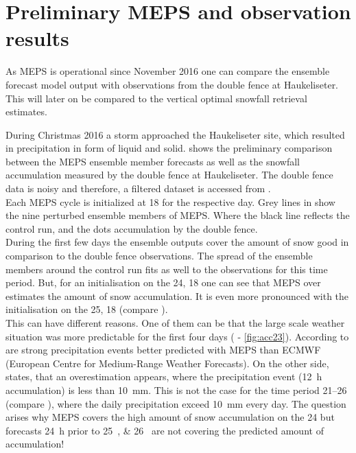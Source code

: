 \section{Preliminary MEPS and observation results}
\label{sec:PrelimMEPS}
As MEPS is operational since November 2016 one can compare the ensemble forecast model output with observations from the double fence at Haukeliseter. This will later on be compared to the vertical optimal snowfall retrieval estimates. 


\noindent
During Christmas 2016 a storm approached the Haukeliseter site, which resulted in precipitation in form of liquid and solid.
 shows the preliminary comparison between the MEPS ensemble member forecasts as well as the snowfall accumulation measured by the double fence at Haukeliseter. The double fence data is noisy and therefore, a filtered dataset is accessed from \cite{eklima_norwegian_2016}.   
\\
Each MEPS cycle is initialized at \SI{18}{\UTC} for the respective day.
Grey lines in  show the nine perturbed ensemble members of MEPS. Where the black line reflects the control run, and the dots accumulation by the double fence.
\\
During the first few days the ensemble outputs cover the amount of snow good in comparison to the double fence observations.
The spread of the ensemble members around the control run fits as well to the observations for this time period. But, for an initialisation on the \SI{24}{\dec}, \SI{18}{\UTC} one can see that  MEPS over estimates the amount of snow accumulation. It is even more pronounced with the initialisation on the \SI{25}{\dec}, \SI{18}{\UTC} (compare ). 
\\
This can have different reasons. One of them can be that the large scale weather situation was more predictable for the first four days ( - \ref{fig:acc23}). 
According to \cite{muller_arome-metcoop:_2017} are strong precipitation events better predicted with MEPS than ECMWF (European Centre for Medium-Range Weather Forecasts). On the other side, \cite{muller_arome-metcoop:_2017} states, that an overestimation appears, where the precipitation event (\SI{12}{\hour} accumulation) is less than \SI{10}{\mm}. This is not the case for the time period \SIrange{21}{26}{\dec} (compare ), where the daily precipitation exceed \SI{10}{\mm} every day. The question arises why MEPS covers the high amount of snow accumulation on the \SI{24}{\dec} but forecasts \SI{24}{\hour} prior to \SIlist{25;26}{\dec} are not covering the predicted amount of accumulation!